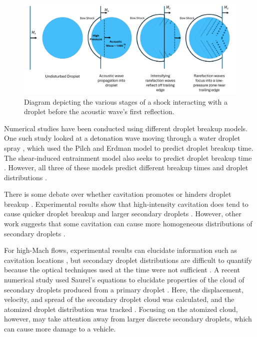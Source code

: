 \documentclass{UCF_ETD}
\begin{document}
\begin{figure}
    \centering
    \includegraphics[width=\linewidth]{Figures/stagesOfShockDrop.png}
    \caption{Diagram depicting the various stages of a shock interacting with a droplet before the acoustic wave's first reflection.}
    \label{fig:shockDropStages}
\end{figure}

Numerical studies have been conducted using different droplet breakup models. One such study looked at a detonation wave moving through a water droplet spray \cite{Xu2021EffectOW}, which used the Pilch and Erdman model to predict droplet breakup time. The shear-induced entrainment model also seeks to predict droplet breakup time \cite{Theofanus}. However, all three of these models predict different breakup times and droplet distributions \cite{Bielawski2024}. 

There is some debate over whether cavitation promotes or hinders droplet breakup \cite{Preiss_cav}. Experimental results show that high-intensity cavitation does tend to cause quicker droplet breakup and larger secondary droplets \cite{Preiss_cav, Gall2022, SCHLENDER201584, Freudig2003, Gothsch2011}. However, other work suggests that some cavitation can cause more homogeneous distributions of secondary droplets \cite{LOO1950692}.

For high-Mach flows, experimental results can elucidate information such as cavitation locations \cite{Briggs2024}, but secondary droplet distributions are difficult to quantify because the optical techniques used at the time were not sufficient \cite{nicholls1969}. 
A recent numerical study used Saurel's equations \cite{RICHARDSAUREL20091678} to elucidate properties of the cloud of secondary droplets produced from a primary droplet \cite{Bielawski2024}. Here, the displacement, velocity, and spread of the secondary droplet cloud was calculated, and the atomized droplet distribution was tracked \cite{Bielawski2024}. Focusing on the atomized cloud, however, may take attention away from larger discrete secondary droplets, which can cause more damage to a vehicle.
\end{document}
